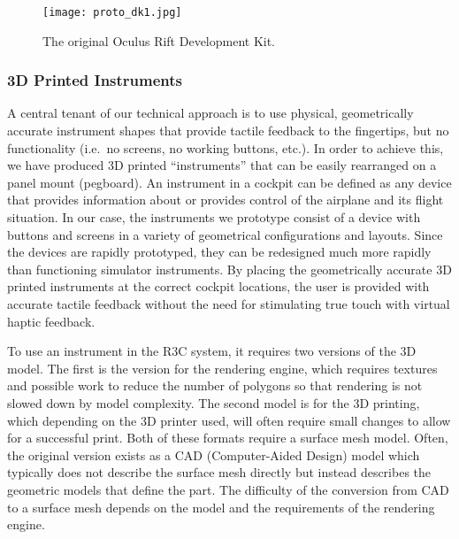 \begin{figure}
    \centering
    \texttt{[image: proto\_dk1.jpg]}
    \caption{The original Oculus Rift Development Kit.}
    \label{fig:proto_oculus}
\end{figure}

\subsubsection{3D Printed Instruments}

A central tenant of our technical approach is to use physical, geometrically accurate instrument shapes that provide tactile feedback to the fingertips, but no functionality (i.e.\ no screens, no working buttons, etc.).
In order to achieve this, we have produced 3D printed ``instruments'' that can be easily rearranged on a panel mount (pegboard).
An instrument in a cockpit can be defined as any device that provides information about or provides control of the airplane and its flight situation.
In our case, the instruments we prototype consist of a device with buttons and screens in a variety of geometrical configurations and layouts.
Since the devices are rapidly prototyped, they can be redesigned much more rapidly than functioning simulator instruments.
By placing the geometrically accurate 3D printed instruments at the correct cockpit locations, the user is provided with accurate tactile feedback without the need for stimulating true touch with virtual haptic feedback.

To use an instrument in the R3C system, it requires two versions of the 3D model.
The first is the version for the rendering engine, which requires textures and possible work to reduce the number of polygons so that rendering is not slowed down by model complexity.
The second model is for the 3D printing, which depending on the 3D printer used, will often require small changes to allow for a successful print.
Both of these formats require a surface mesh model.
Often, the original version exists as a CAD (Computer-Aided Design) model which typically does not describe the surface mesh directly but instead describes the geometric models that define the part.
The difficulty of the conversion from CAD to a surface mesh depends on the model and the requirements of the rendering engine.

